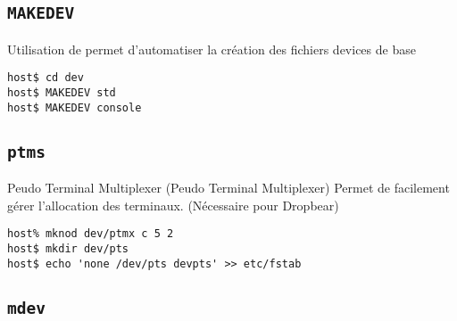 \subsection{\texttt{MAKEDEV}}

\begin{frame}[fragile=singleslide]{Utilisation de }
   permet d'automatiser  la création des fichiers devices
  de base
  \begin{lstlisting}
host$ cd dev
host$ MAKEDEV std
host$ MAKEDEV console
  \end{lstlisting}
\end{frame}

\subsection{\texttt{ptms}}

\begin{frame}[fragile=singleslide]{Peudo Terminal Multiplexer}
   (Peudo  Terminal Multiplexer) Permet  de facilement gérer
  l'allocation des terminaux. (Nécessaire pour Dropbear)
  \begin{lstlisting}
host% mknod dev/ptmx c 5 2
host$ mkdir dev/pts
host$ echo 'none /dev/pts devpts' >> etc/fstab
  \end{lstlisting}
\end{frame}

\subsection{\texttt{mdev}}

